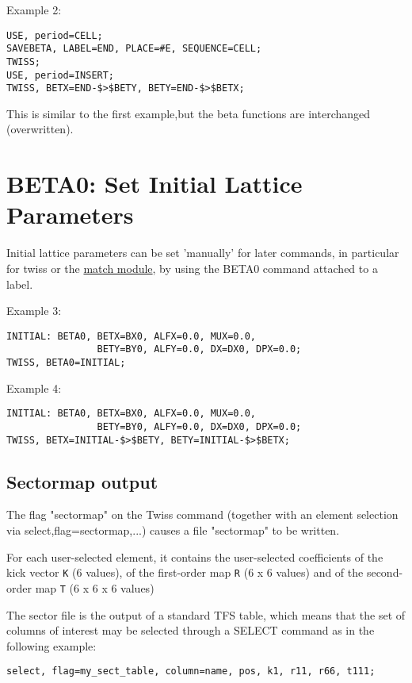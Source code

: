 Example 2: 
\begin{verbatim}
USE, period=CELL;
SAVEBETA, LABEL=END, PLACE=#E, SEQUENCE=CELL;
TWISS;
USE, period=INSERT;
TWISS, BETX=END-$>$BETY, BETY=END-$>$BETX;
\end{verbatim}
This is similar to the first example,but the beta functions are interchanged (overwritten).  

\section{BETA0: Set Initial Lattice Parameters}

Initial lattice parameters can be set 'manually' for later commands, in
particular for twiss or the \href{../match/match.html}{match module}, by
using the BETA0 command attached to a label.  

Example 3: 
\begin{verbatim}
INITIAL: BETA0, BETX=BX0, ALFX=0.0, MUX=0.0, 
                BETY=BY0, ALFY=0.0, DX=DX0, DPX=0.0;
TWISS, BETA0=INITIAL;
\end{verbatim}

Example 4: 
\begin{verbatim}
INITIAL: BETA0, BETX=BX0, ALFX=0.0, MUX=0.0, 
                BETY=BY0, ALFY=0.0, DX=DX0, DPX=0.0;
TWISS, BETX=INITIAL-$>$BETY, BETY=INITIAL-$>$BETX;
\end{verbatim}



%
\subsection{Sectormap output}
\label{subsec:sectormap}

The flag "sectormap" on the Twiss command (together with an element
selection via select,flag=sectormap,...) causes a file "sectormap" to be
written.   

For each user-selected element, it contains the user-selected coefficients of the kick vector 
\texttt{K} (6 values), of the first-order map 
\texttt{R} (6 x 6 values) and of the second-order map 
\texttt{T} (6 x 6 x 6 values)

The sector file is the output of a standard TFS table, which means that
the set of columns of interest may be selected through a SELECT command
as in the following example:  


\begin{verbatim}
select, flag=my_sect_table, column=name, pos, k1, r11, r66, t111;
\end{verbatim}


